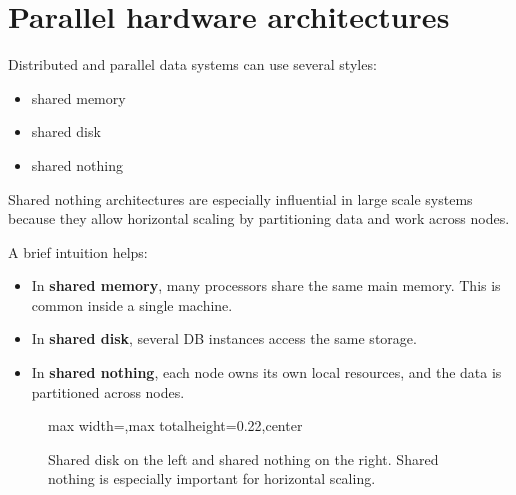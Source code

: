 \documentclass[11pt,a4paper,openany]{book}
\begin{document}
\section{Parallel hardware architectures}
Distributed and parallel data systems can use several styles:

\begin{itemize}
\item shared memory
\item shared disk
\item shared nothing
\end{itemize}

Shared nothing architectures are especially influential in large scale systems because they allow horizontal scaling by partitioning data and work across nodes.

A brief intuition helps:
\begin{itemize}
\item In \textbf{shared memory}, many processors share the same main memory. This is common inside a single machine.
\item In \textbf{shared disk}, several DB instances access the same storage.
\item In \textbf{shared nothing}, each node owns its own local resources, and the data is partitioned across nodes.
\end{itemize}

\begin{figure}[tbp]
\centering
\begin{adjustbox}{max width=\linewidth,max totalheight=0.22\textheight,center}
\end{adjustbox}
\caption{Shared disk on the left and shared nothing on the right. Shared nothing is especially important for horizontal scaling.}
\label{fig:dw-parallel-architectures}
\end{figure}
\end{document}
